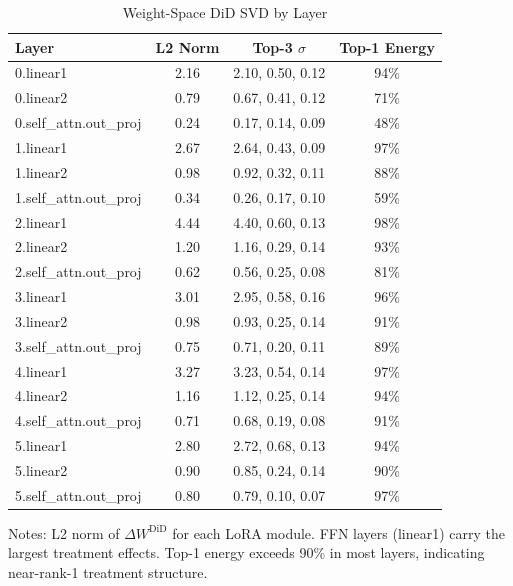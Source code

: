 \documentclass[12pt]{article}
\begin{document}
\begin{table}[H]
\centering
\caption{Weight-Space DiD SVD by Layer}
\label{tab:svd}
\begin{threeparttable}
\begin{tabular}{lccc}
\toprule
Layer & L2 Norm & Top-3 $\sigma$ & Top-1 Energy \\
\midrule
0.linear1 & 2.16 & 2.10, 0.50, 0.12 & 94\% \\
0.linear2 & 0.79 & 0.67, 0.41, 0.12 & 71\% \\
0.self\_attn.out\_proj & 0.24 & 0.17, 0.14, 0.09 & 48\% \\
\addlinespace
1.linear1 & 2.67 & 2.64, 0.43, 0.09 & 97\% \\
1.linear2 & 0.98 & 0.92, 0.32, 0.11 & 88\% \\
1.self\_attn.out\_proj & 0.34 & 0.26, 0.17, 0.10 & 59\% \\
\addlinespace
2.linear1 & 4.44 & 4.40, 0.60, 0.13 & 98\% \\
2.linear2 & 1.20 & 1.16, 0.29, 0.14 & 93\% \\
2.self\_attn.out\_proj & 0.62 & 0.56, 0.25, 0.08 & 81\% \\
\addlinespace
3.linear1 & 3.01 & 2.95, 0.58, 0.16 & 96\% \\
3.linear2 & 0.98 & 0.93, 0.25, 0.14 & 91\% \\
3.self\_attn.out\_proj & 0.75 & 0.71, 0.20, 0.11 & 89\% \\
\addlinespace
4.linear1 & 3.27 & 3.23, 0.54, 0.14 & 97\% \\
4.linear2 & 1.16 & 1.12, 0.25, 0.14 & 94\% \\
4.self\_attn.out\_proj & 0.71 & 0.68, 0.19, 0.08 & 91\% \\
\addlinespace
5.linear1 & 2.80 & 2.72, 0.68, 0.13 & 94\% \\
5.linear2 & 0.90 & 0.85, 0.24, 0.14 & 90\% \\
5.self\_attn.out\_proj & 0.80 & 0.79, 0.10, 0.07 & 97\% \\
\bottomrule
\end{tabular}
\begin{tablenotes}[flushleft]
\small
\item Notes: L2 norm of $\Delta W^{\text{DiD}}$ for each LoRA module. FFN layers (linear1) carry the largest treatment effects. Top-1 energy exceeds 90\% in most layers, indicating near-rank-1 treatment structure.
\end{tablenotes}
\end{threeparttable}
\end{table}
\end{document}
